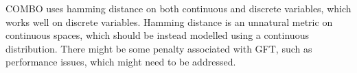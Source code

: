 \documentclass[
    american,a4paper
    ]{scrartcl}
\newcommand{\lang}{en}
\begin{document}
\begin{description}[style=unboxed]
            \item [\questionFour{\lang}]
                COMBO uses hamming distance on both continuous and discrete variables, which works well on discrete variables.
                Hamming distance is an unnatural metric on continuous spaces, which should be instead modelled using a continuous distribution.
                There might be some penalty associated with GFT, such as performance issues, which might need to be addressed.
        \end{description}
        
        \sectionSource{\lang}
        \sectionSourceDescription{\lang}
\end{document}
